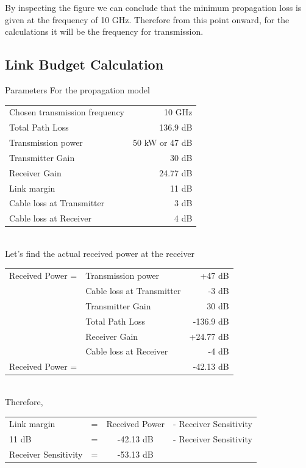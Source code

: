 \documentclass[a4paper,11pt]{article}%
\begin{document}
By inspecting the figure we can conclude that the minimum propagation loss is given at the frequency of 10 GHz. Therefore from this point onward, for the calculations it will be the frequency for transmission.

\subsection{Link Budget Calculation}

Parameters For the propagation model 
\begin{tabular}{l r} 
Chosen transmission frequency & 10 GHz\\
Total Path Loss & 136.9 dB\\
Transmission power & 50 kW or 47 dB\\
Transmitter Gain & 30 dB\\
Receiver Gain &24.77 dB\\
Link margin  &11 dB\\
Cable loss at Transmitter & 3 dB\\
Cable loss at Receiver &4 dB\\
\end{tabular}\\[1cm]

Let's find the actual received power at the receiver\\

\begin{tabular}{|l l| r|}
	\hline
Received Power =	&Transmission power & +47 dB\\
&	Cable loss at Transmitter & -3 dB\\
&	Transmitter Gain & 30 dB\\
&	Total Path Loss & -136.9 dB\\
&	Receiver Gain &+24.77 dB\\
&	Cable loss at Receiver &-4 dB\\\hline
Received Power =&&-42.13 dB\\\hline\hline	
\end{tabular}\\[1cm]


Therefore,\\ 
\begin{center}
	\begin{tabular}{l c c c}
Link margin  & =& Received Power& - Receiver Sensitivity\\
11 dB& = &-42.13 dB& - Receiver Sensitivity\\
Receiver Sensitivity &= &-53.13 dB& \\\hline\hline
\end{tabular}

\end{center}
\end{document}
